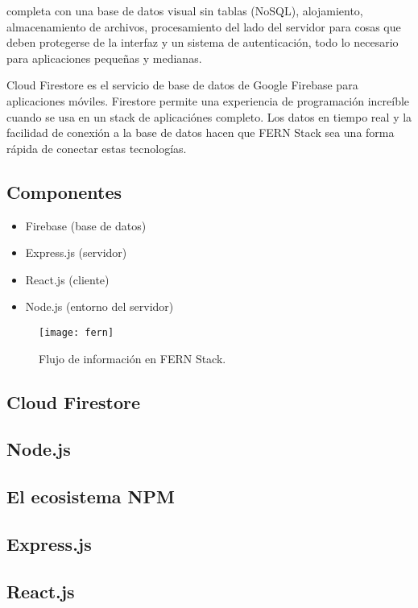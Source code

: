 completa con una base de datos visual sin tablas (NoSQL), alojamiento, almacenamiento de archivos, procesamiento del lado del servidor para cosas que deben protegerse de la interfaz y un sistema de autenticación, todo lo necesario para aplicaciones pequeñas y medianas.
\vspace{0.8cm}

Cloud Firestore es el servicio de base de datos de Google Firebase para aplicaciones móviles. Firestore permite una experiencia de programación increíble cuando se usa en un stack de aplicaciónes completo. Los datos en tiempo real y la facilidad de conexión a la base de datos hacen que FERN Stack sea una forma rápida de conectar estas tecnologías. 

\subsection{Componentes}
\begin{itemize}
  \item Firebase (base de datos)
  \item Express.js (servidor)
  \item React.js (cliente)
  \item Node.js (entorno del servidor)
\end{itemize}
\begin{figure}[H]
  \centering
  \texttt{[image: fern]}
  \caption{Flujo de información en FERN Stack.}
\end{figure}

\subsection{Cloud Firestore}


\subsection{Node.js}


\subsection{El ecosistema NPM}


\subsection{Express.js}


\subsection{React.js}

